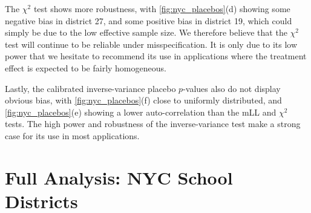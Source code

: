     The \(\chi^2\) test shows more robustness, with \autoref{fig:nyc_placebos}(d) showing some negative bias in district 27, and some positive bias in district 19, which could simply be due to the low effective sample size.
We therefore believe that the \(\chi^2\) test will continue to be reliable under misspecification.
It is only due to its low power that we hesitate to recommend its use in applications where the treatment effect is expected to be fairly homogeneous.

    Lastly, the calibrated inverse-variance placebo \(p\)-values also do not display obvious bias, with \autoref{fig:nyc_placebos}(f) close to uniformly distributed, and \autoref{fig:nyc_placebos}(e) showing a lower auto-correlation than the mLL and \(\chi^2\) tests.
The high power and robustness of the inverse-variance test make a strong case for its use in most applications.


\section{Full Analysis: NYC School Districts}
\label{pairs-of-school-districts}

